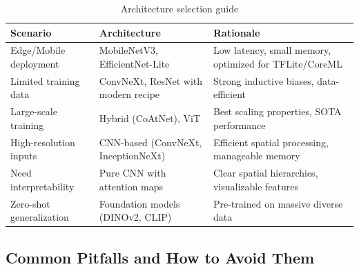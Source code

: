 \documentclass{article}
\begin{document}
\begin{table}[h]
\centering
\small
\begin{tabular}{|l|l|p{6cm}|}
\hline
\textbf{Scenario} & \textbf{Architecture} & \textbf{Rationale} \\
\hline
Edge/Mobile deployment & MobileNetV3, EfficientNet-Lite & Low latency, small memory, optimized for TFLite/CoreML \\
\hline
Limited training data & ConvNeXt, ResNet with modern recipe & Strong inductive biases, data-efficient \\
\hline
Large-scale training & Hybrid (CoAtNet), ViT & Best scaling properties, SOTA performance \\
\hline
High-resolution inputs & CNN-based (ConvNeXt, InceptionNeXt) & Efficient spatial processing, manageable memory \\
\hline
Need interpretability & Pure CNN with attention maps & Clear spatial hierarchies, visualizable features \\
\hline
Zero-shot generalization & Foundation models (DINOv2, CLIP) & Pre-trained on massive diverse data \\
\hline
\end{tabular}
\caption{Architecture selection guide}
\end{table}

\subsection{Common Pitfalls and How to Avoid Them}
\end{document}
